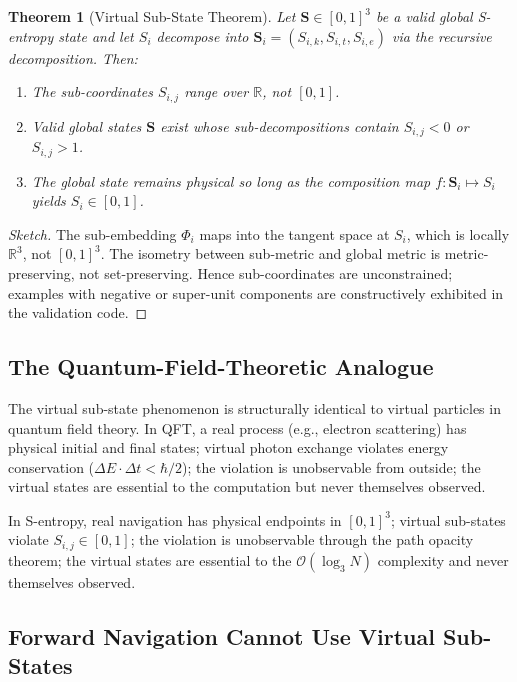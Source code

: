 \documentclass[twocolumn,11pt,a4paper]{article}
\newtheorem{theorem}{Theorem}[section]
\begin{document}
\begin{theorem}[Virtual Sub-State Theorem]
\label{thm:virtual}
Let $\mathbf{S} \in [0,1]^3$ be a valid global S-entropy state and let $S_i$ decompose into $\mathbf{S}_i = (S_{i,k}, S_{i,t}, S_{i,e})$ via the recursive decomposition. Then:
\begin{enumerate}[leftmargin=*,itemsep=1pt]
\item The sub-coordinates $S_{i,j}$ range over $\mathbb{R}$, not $[0,1]$.
\item Valid global states $\mathbf{S}$ exist whose sub-decompositions contain $S_{i,j} < 0$ or $S_{i,j} > 1$.
\item The global state remains physical so long as the composition map $f : \mathbf{S}_i \mapsto S_i$ yields $S_i \in [0,1]$.
\end{enumerate}
\end{theorem}

\begin{proof}[Sketch]
The sub-embedding $\Phi_i$ maps into the tangent space at $S_i$, which is locally $\mathbb{R}^3$, not $[0,1]^3$. The isometry between sub-metric and global metric is metric-preserving, not set-preserving. Hence sub-coordinates are unconstrained; examples with negative or super-unit components are constructively exhibited in the validation code.
\end{proof}

\subsection{The Quantum-Field-Theoretic Analogue}

The virtual sub-state phenomenon is structurally identical to virtual particles in quantum field theory. In QFT, a real process (e.g., electron scattering) has physical initial and final states; virtual photon exchange violates energy conservation ($\Delta E \cdot \Delta t < \hbar/2$); the violation is unobservable from outside; the virtual states are essential to the computation but never themselves observed.

In S-entropy, real navigation has physical endpoints in $[0,1]^3$; virtual sub-states violate $S_{i,j} \in [0,1]$; the violation is unobservable through the path opacity theorem; the virtual states are essential to the $\mathcal{O}(\log_3 N)$ complexity and never themselves observed.

\subsection{Forward Navigation Cannot Use Virtual Sub-States}
\end{document}
